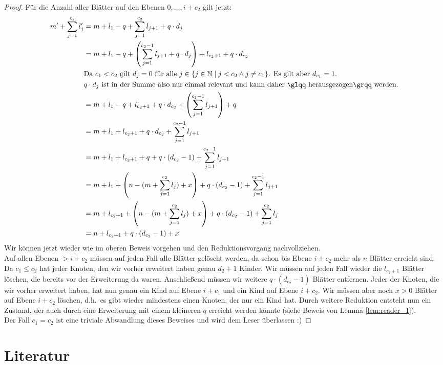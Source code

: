 \documentclass[a4paper,10pt,ngerman]{scrartcl}
\begin{document}
\begin{proof}
        Für die Anzahl aller Blätter auf den Ebenen $0, \dots, i + c_2$ gilt jetzt:
        \begin{equation}
            \begin{aligned}
                m' + \sum^{c_2}_{j=1} l_j' &= m + l_1 - q + \sum^{c_2}_{j=1} l_{j+1} + q \cdot d_j\\
                &= m + l_1 - q + \left(\sum^{c_2-1}_{j=1} l_{j+1} + q \cdot d_j\right) + l_{c_2 + 1} + q \cdot d_{c_2}\\
                &\text{Da $c_1 < c_2$ gilt $d_j = 0$ für alle $j \in \{j \in \mathbb N \mid j < c_2 \land j \neq c_1\}$. Es gilt aber $d_{c_1} = 1$.} \\
                &\text{$q \cdot d_j$ ist in der Summe also nur einmal relevant und kann daher \glqq herausgezogen\grqq~werden.} \\
                &= m + l_1 - q + l_{c_2 + 1} + q \cdot d_{c_2} + \left(\sum^{c_2-1}_{j=1} l_{j+1}\right) + q\\
                &= m + l_1 + l_{c_2 + 1} + q \cdot d_{c_2} + \sum^{c_2-1}_{j=1} l_{j+1}\\
                &=m + l_1 + l_{c_2 + 1} + q + q \cdot (d_{c_2} - 1)  + \sum^{c_2-1}_{j=1} l_{j+1} \\
                &= m + l_1 +  \left(n - (m + \sum^{c_2}_{j=1} l_j) + x\right) + q \cdot (d_{c_2} - 1) + \sum^{c_2-1}_{j=1} l_{j+1} \\
                &= m + l_{c_2 + 1} +  \left(n - (m + \sum^{c_2}_{j=1} l_j) + x\right) + q \cdot (d_{c_2} - 1) + \sum^{c_2}_{j=1} l_{j} \\
                &= n + l_{c_2 + 1} + q \cdot (d_{c_2} - 1) + x\\
            \end{aligned}\label{eq:equation2}
        \end{equation}
        Wir können jetzt wieder wie im oberen Beweis vorgehen und den Reduktionsvorgang nachvollziehen. \\
        Auf allen Ebenen $> i + c_2$ müssen auf jeden Fall alle Blätter gelöscht werden, da schon bis Ebene $i + c_2$ mehr als $n$ Blätter erreicht sind.
        Da $c_1 \le c_2$ hat jeder Knoten, den wir vorher erweitert haben genau $d_2 + 1$ Kinder.
        Wir müssen auf jeden Fall wieder die $l_{c_2 + 1}$ Blätter löschen, die bereits vor der Erweiterung da waren.
        Anschließend müssen wir weitere $q \cdot (d_{c_2} - 1)$ Blätter entfernen.
        Jeder der Knoten, die wir vorher erweitert haben, hat nun genau ein Kind auf Ebene $i + c_1$ und ein Kind auf Ebene $i + c_2$.
        Wir müssen aber noch $x > 0$ Blätter auf Ebene $i + c_2$ löschen, d.h.\ es gibt wieder mindestens einen Knoten, der nur ein Kind hat.
        Durch weitere Reduktion entsteht nun ein Zustand, der auch durch eine Erweiterung mit einem kleineren $q$ erreicht werden könnte (siehe Beweis von Lemma \ref{lem:reader_1}). \\
        Der Fall $c_1 = c_2$ ist eine triviale Abwandlung dieses Beweises und wird dem Leser überlassen :)
    \end{proof}


    \section{Literatur}
    \printbibliography[heading=none]
\end{document}
